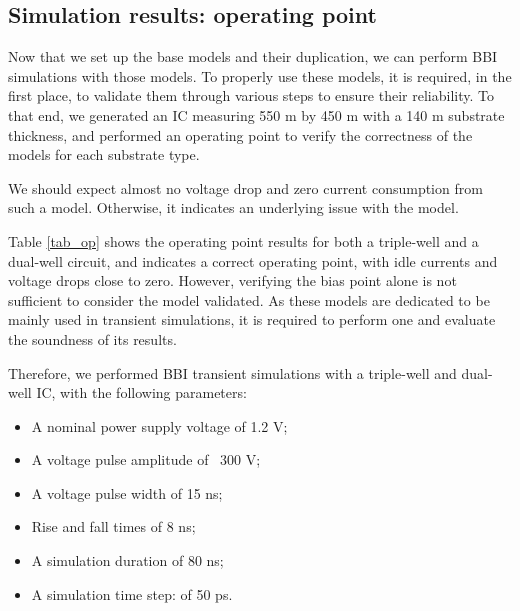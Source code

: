 \subsection{Simulation results: operating point}
	Now that we set up the base models and their duplication, we can perform BBI simulations with those models.
	To properly use these models, it is required, in the first place, to validate them through various steps to ensure their reliability.
	To that end, we generated an IC measuring 550 \textmu m by 450 \textmu m with a 140 \textmu m substrate thickness, and performed an operating point to verify the correctness of the models for each substrate type.
	
	We should expect almost no voltage drop and zero current consumption from such a model.
	Otherwise, it indicates an underlying issue with the model.

	Table \ref{tab_op} shows the operating point results for both a triple-well and a dual-well circuit, and indicates a correct operating point, with idle currents and voltage drops close to zero.
	However, verifying the bias point alone is not sufficient to consider the model validated.
	As these models are dedicated to be mainly used in transient simulations, it is required to perform one and evaluate the soundness of its results.

	Therefore, we performed BBI transient simulations with a triple-well and dual-well IC, with the following parameters:
	\begin{itemize}
		\item A nominal power supply voltage of 1.2 V;
		\item A voltage pulse amplitude of \textpm\ 300 V;
		\item A voltage pulse width of 15 ns;
		\item Rise and fall times of 8 ns;
		\item A simulation duration of 80 ns;
		\item A simulation time step: of 50 ps.
	\end{itemize}

